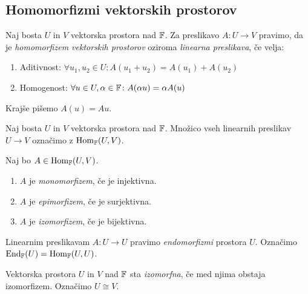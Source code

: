 \documentclass[12pt, a4paper]{article}
\begin{document}
\obvs

\newpage

\subsection{Homomorfizmi vektorskih prostorov}

\begin{okvir}
\begin{definicija}
Naj bosta $U$ in $V$ vektorska prostora nad $\mathbb{F}$. Za preslikavo $A\colon U\to V$ pravimo, da je \emph{homomorfizem vektorskih prostorov} oziroma \emph{linearna preslikava}, če velja:

\begin{enumerate}[label=\roman*)]
\item Aditivnost: $\forall u_1,u_2\in U\colon A(u_1+u_2)=A(u_1)+A(u_2)$ 
\item Homogenost: $\forall u\in U,\alpha\in\mathbb{F}\colon A(\alpha u)=\alpha A(u)$ 
\end{enumerate}

Krajše pišemo $A(u)=Au$.
\end{definicija}
\end{okvir}

\begin{definicija}
Naj bosta $U$ in $V$ vektorska prostora nad $\mathbb{F}$. Množico vseh linearnih preslikav $U\to V$ označimo z $\operatorname{Hom}_{\mathbb{F}}(U,V)$.
\end{definicija}

\begin{definicija}
Naj bo $A\in\operatorname{Hom}_{\mathbb{F}}(U,V)$.

\begin{enumerate}[label=\roman*)]
\item $A$ je \emph{monomorfizem}, če je injektivna.
\item $A$ je \emph{epimorfizem}, če je surjektivna.
\item $A$ je \emph{izomorfizem}, če je bijektivna.
\end{enumerate}
\end{definicija}

\begin{definicija}
Linearnim preslikavam $A\colon U\to U$ pravimo \emph{endomorfizmi} prostora $U$. Označimo $\operatorname{End}_{\mathbb{F}}(U)=\operatorname{Hom}_{\mathbb{F}}(U,U)$.
\end{definicija}

\begin{definicija}
Vektorska prostora $U$ in $V$ nad $\mathbb{F}$ sta \emph{izomorfna}, če med njima obstaja izomorfizem. Označimo $U\cong V$.
\end{definicija}
\end{document}
